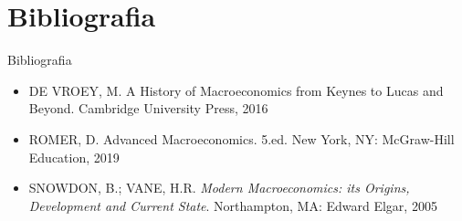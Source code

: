 \documentclass[10pt]{beamer}
\begin{document}
\section{Bibliografia}
\begin{frame}{ Bibliografia}
    \begin{itemize}                        
        \item DE VROEY, M. A History of Macroeconomics from Keynes to Lucas and Beyond. Cambridge University Press, 2016\medskip
        \item ROMER, D. Advanced Macroeconomics. 5.ed. New York, NY: McGraw-Hill Education, 2019\medskip
        \item SNOWDON, B.; VANE, H.R. \emph{Modern Macroeconomics: its Origins, Development and Current State}. Northampton, MA: Edward Elgar, 2005\medskip        
    \end{itemize}
\end{frame}
\end{document}
